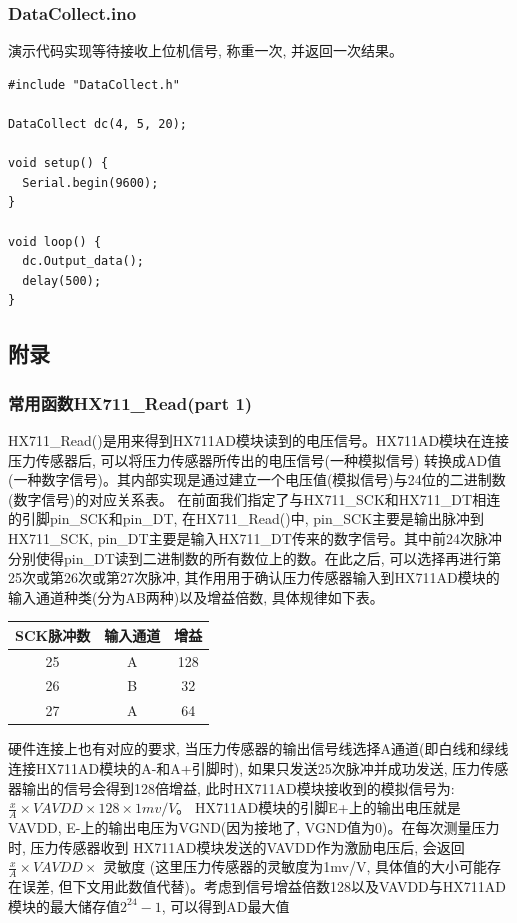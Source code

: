 \documentclass{article}
\begin{document}
\subsubsection{DataCollect.ino}
演示代码实现等待接收上位机信号, 称重一次, 并返回一次结果。
\begin{lstlisting}
#include "DataCollect.h"

DataCollect dc(4, 5, 20);

void setup() {
  Serial.begin(9600);
}

void loop() {
  dc.Output_data();
  delay(500);
}
\end{lstlisting}

\subsection{附录}
\subsubsection{常用函数HX711\_Read(part 1)}
HX711\_Read()是用来得到HX711AD模块读到的电压信号。HX711AD模块在连接压力传感器后, 可以将压力传感器所传出的电压信号(一种模拟信号)
转换成AD值(一种数字信号)。其内部实现是通过建立一个电压值(模拟信号)与24位的二进制数(数字信号)的对应关系表。 
在前面我们指定了与HX711\_SCK和HX711\_DT相连的引脚pin\_SCK和pin\_DT, 在HX711\_Read()中, pin\_SCK主要是输出脉冲到
HX711\_SCK, pin\_DT主要是输入HX711\_DT传来的数字信号。其中前24次脉冲分别使得pin\_DT读到二进制数的所有数位上的数。在此之后,
可以选择再进行第25次或第26次或第27次脉冲, 其作用用于确认压力传感器输入到HX711AD模块的输入通道种类(分为AB两种)以及增益倍数, 
具体规律如下表。

\begin{tabular}{|c|c|c|}
\hline
SCK脉冲数&输入通道&增益\\
\hline
25&A&128\\
\hline
26&B&32\\
\hline
27&A&64\\
\hline
\end{tabular}

硬件连接上也有对应的要求, 当压力传感器的输出信号线选择A通道(即白线和绿线连接HX711AD模块的A-和A+引脚时), 如果只发送25次脉冲并成功发送,
压力传感器输出的信号会得到128倍增益, 此时HX711AD模块接收到的模拟信号为:$\frac{x}{A} \times VAVDD\times 128\times 1 mv/V $。
HX711AD模块的引脚E+上的输出电压就是VAVDD, E-上的输出电压为VGND(因为接地了, VGND值为0)。在每次测量压力时, 压力传感器收到
HX711AD模块发送的VAVDD作为激励电压后, 会返回$\frac{x}{A} \times VAVDD \times$ 灵敏度 (这里压力传感器的灵敏度为1mv/V, 
具体值的大小可能存在误差, 但下文用此数值代替)。考虑到信号增益倍数128以及VAVDD与HX711AD模块的最大储存值$2^{24}-1$, 可以得到AD最大值
\end{document}
